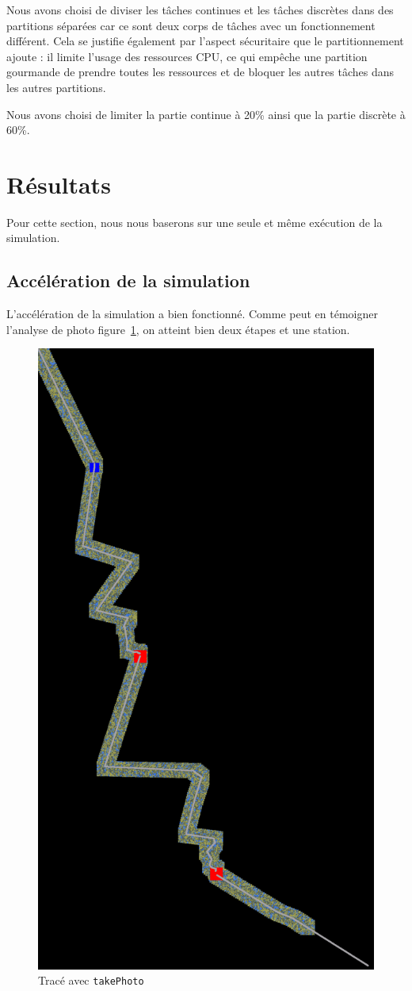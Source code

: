 \documentclass[conference]{IEEEtran}
\begin{document}
Nous avons choisi de diviser les tâches continues et les tâches discrètes dans des partitions séparées car ce sont deux corps de tâches avec un fonctionnement différent. Cela se justifie également par l'aspect sécuritaire que le partitionnement ajoute : il limite l'usage des ressources CPU, ce qui empêche une partition gourmande de prendre toutes les ressources et de bloquer les autres tâches dans les autres partitions.

Nous avons choisi de limiter la partie continue à 20\% ainsi que la partie discrète à 60\%.



\section{Résultats}
\label{sec:resultats}

Pour cette section, nous nous baserons sur une seule et même exécution de la simulation.

\subsection{Accélération de la simulation}

L'accélération de la simulation a bien fonctionné. Comme peut en témoigner l'analyse de photo figure~\ref{fig:path_image}, on atteint bien deux étapes et une station.

\begin{figure}
    \centering
    \includegraphics[height=0.7\linewidth]{map.png}
    \caption{Tracé avec \texttt{takePhoto}}
    \label{fig:path_image}
\end{figure}
\end{document}
